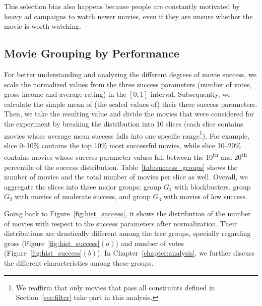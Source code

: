 This selection bias also happens because people are constantly motivated by
heavy ad campaigns to watch newer movies, even if they are unsure whether the
movie is worth watching.

\subsection{Movie Grouping by Performance}
For better understanding and analyzing the different degrees of movie success,
we scale the normalized values from the three success parameters (number of
votes, gross income and average rating) in the $[0, 1]$ interval. Subsequently,
we calculate the simple mean of (the scaled values of) their three success
parameters. Then, we take the resulting value and divide the movies that were
considered for the experiment by breaking the distribution into 10 slices (each
slice contains movies whose average mean success falls into one specific
range\footnote{We reaffirm that only movies that pass all constraints defined
in Section~\ref{sec:filter} take part in this analysis.}). For example, slice
0--10\%  contains the top 10\% most successful movies, while slice 10--20\%
contains movies whose success parameter values fall between the
10\textsuperscript{th} and 20\textsuperscript{th} percentile of the success
distribution. Table~\ref{tab:success_groups} shows the number of movies and the
total number of movies per slice as well. Overall, we aggregate the slices into
three major groups: group $G_1$ with blockbusters, group $G_2$ with movies of
moderate success, and group $G_3$ with movies of low success.



Going back to Figure~\ref{fig:hist_success}, it shows the distribution of the
number of movies with respect to the success parameters after normalization.
Their distributions are drastically different among the tree groups, specially
regarding gross (Figure~\ref{fig:hist_success}$(a)$) and number of votes
(Figure~\ref{fig:hist_success}$(b)$). In Chapter~\ref{chapter:analysis}, we
further discuss the different characteristics among these groups.

